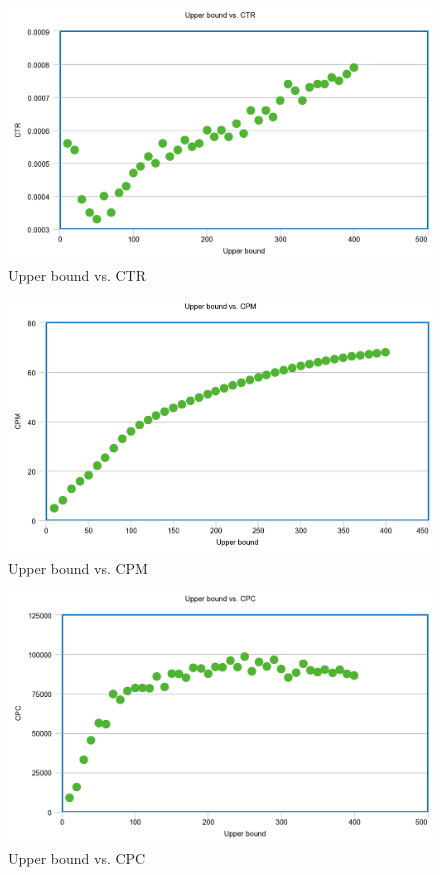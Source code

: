 \documentclass{sig-alternate-05-2015}
\begin{document}
\begin{figure}
  \includegraphics[width=\linewidth]{random_ctr.png}
  \caption{Upper bound vs. CTR}
  \label{fig:CPM}
\end{figure}

\begin{figure}
  \includegraphics[width=\linewidth]{random_CPM.png}
  \caption{Upper bound vs. CPM}
  \label{fig:CPM}
\end{figure}

\begin{figure}
  \includegraphics[width=\linewidth]{random_cpc.png}
  \caption{Upper bound vs. CPC}
  \label{fig:CPM}
\end{figure}
\end{document}
